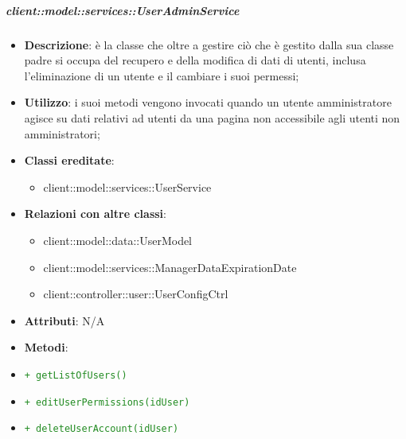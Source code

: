 		\subparagraph{client::model::services::UserAdminService} %
		\label{subp:client_model_services_useradminservice}
			\begin{itemize}
				\item \textbf{Descrizione}: è la classe che oltre a gestire ciò che è gestito dalla sua classe padre si occupa del recupero e della modifica di dati di utenti, inclusa l'eliminazione di un utente e il cambiare i suoi permessi;
				\item \textbf{Utilizzo}: i suoi metodi vengono invocati quando un utente amministratore agisce su dati relativi ad utenti da una pagina non accessibile agli utenti non amministratori;
				\item \textbf{Classi ereditate}:
					\begin{itemize}
						\item client::model::services::UserService
					\end{itemize}
				\item \textbf{Relazioni con altre classi}:
					\begin{itemize}
						\item client::model::data::UserModel
						\item client::model::services::ManagerDataExpirationDate
						\item client::controller::user::UserConfigCtrl
					\end{itemize}
				\item \textbf{Attributi}: N/A
				\item \textbf{Metodi}:
				\item \textcolor{forestgreen}{\texttt{+ getListOfUsers()}}
					\item \textcolor{forestgreen}{\texttt{+ editUserPermissions(idUser)}}
					\item \textcolor{forestgreen}{\texttt{+ deleteUserAccount(idUser)}}
				\end{itemize}

